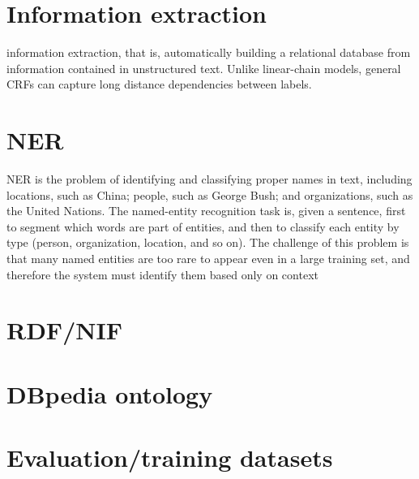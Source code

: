\documentclass[thesis=M,english]{FITthesis}[2018/05/30]
\begin{document}
\section{Information extraction}
information extraction, that is, automatically building a relational database from information contained in unstructured text. Unlike linear-chain models, general CRFs can capture long distance dependencies between labels. 

\section{NER}
NER is the problem of identifying and classifying proper names in text, including locations, such as China; people, such as George Bush; and organizations, such as the United Nations. The named-entity recognition task is, given a sentence, first to segment which words are part of entities, and then to classify each entity by type (person, organization, location, and so on). The challenge of this problem is that many named entities are too rare to appear even in a large training set, and therefore the system must identify them based only on context
\section{RDF/NIF}

\section{DBpedia ontology}

\section{Evaluation/training datasets}
\end{document}
